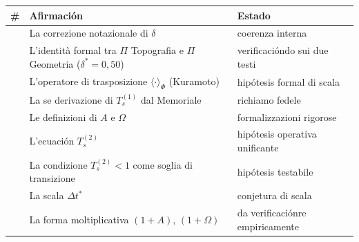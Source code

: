 {\def\LTcaptype{none} %
{\small\begin{longtable}[]{@{}
  >{\raggedright\arraybackslash}p{}
  >{\raggedright\arraybackslash}p{}
  >{\raggedright\arraybackslash}p{}@{}}
\toprule\noalign{}
\begin{minipage}[b]{\linewidth}\raggedright
\#
\end{minipage} & \begin{minipage}[b]{\linewidth}\raggedright
Afirmación
\end{minipage} & \begin{minipage}[b]{\linewidth}\raggedright
Estado
\end{minipage} \\
\midrule\noalign{}
\endhead
\bottomrule\noalign{}
\endlastfoot
1 & La correzione notazionale di \(\delta\) & \Proved{} coerenza
interna \\
2 & L'identità formal tra \(\Pi\) Topografia e \(\Pi\) Geometria
(\(\delta^*=0{,}50\)) & \Proved{} verificacióndo sui due testi \\
3 & L'operatore di trasposizione \(\langle\cdot\rangle_\Phi\) (Kuramoto)
& \Hypoth{} hipótesis formal di scala \\
4 & La se derivazione di \(T_s^{(1)}\) dal Memoriale & \Proved{} richiamo
fedele \\
5 & Le definizioni di \(A\) e \(\Omega\) & \Proved{} formalizzazioni
rigorose \\
6 & L'ecuación \(T_s^{(2)}\) & \Hypoth{} hipótesis operativa
unificante \\
7 & La condizione \(T_s^{(2)} < 1\) come soglia di transizione &
\Hypoth{} hipótesis testabile \\
8 & La scala \(\Delta t^*\) & \Conj{} conjetura di scala \\
9 & La forma moltiplicativa \((1+A)\), \((1+\Omega)\) & \ToVerify{} da
verificaciónre empiricamente \\
\end{longtable}}
}


